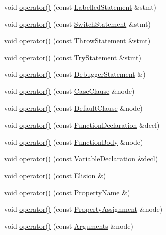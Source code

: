 \begin{DoxyCompactItemize}
void \hyperlink{struct_basic_visitor_af81c51e8a36db9ab923df747463afc11}{operator()} (const \hyperlink{struct_labelled_statement}{Labelled\+Statement} \&stmt)
\item 
void \hyperlink{struct_basic_visitor_ac83f72616fb477a7a649065185eb3895}{operator()} (const \hyperlink{struct_switch_statement}{Switch\+Statement} \&stmt)
\item 
void \hyperlink{struct_basic_visitor_ac42a17b7d2cb244a0b98edce715bd50c}{operator()} (const \hyperlink{struct_throw_statement}{Throw\+Statement} \&stmt)
\item 
void \hyperlink{struct_basic_visitor_a670967e4fafdaff24b8191e9d726ca6a}{operator()} (const \hyperlink{struct_try_statement}{Try\+Statement} \&stmt)
\item 
void \hyperlink{struct_basic_visitor_a643d2e0e4fa076004a987108a455ab5d}{operator()} (const \hyperlink{struct_debugger_statement}{Debugger\+Statement} \&)
\item 
void \hyperlink{struct_basic_visitor_a236e03a953fe8f6c29d764ddd0933653}{operator()} (const \hyperlink{struct_case_clause}{Case\+Clause} \&node)
\item 
void \hyperlink{struct_basic_visitor_a427e6c179f8f598d5c24356701ece311}{operator()} (const \hyperlink{struct_default_clause}{Default\+Clause} \&node)
\item 
void \hyperlink{struct_basic_visitor_af4a6c12c35d165ecf96361ec3faf0583}{operator()} (const \hyperlink{struct_function_declaration}{Function\+Declaration} \&decl)
\item 
void \hyperlink{struct_basic_visitor_a04ba3e59b4d7a7dc9764c3d6fcde6c06}{operator()} (const \hyperlink{struct_function_body}{Function\+Body} \&node)
\item 
void \hyperlink{struct_basic_visitor_a89040003d494fc8559a9d0b19d0e657d}{operator()} (const \hyperlink{struct_variable_declaration}{Variable\+Declaration} \&decl)
\item 
void \hyperlink{struct_basic_visitor_a365b77b2a395a7525224bcb5d422115a}{operator()} (const \hyperlink{struct_elision}{Elision} \&)
\item 
void \hyperlink{struct_basic_visitor_ae447a2098b51b5a9fc6bfd83798ffb01}{operator()} (const \hyperlink{struct_property_name}{Property\+Name} \&)
\item 
void \hyperlink{struct_basic_visitor_af6767fb4a5b244ccacc56e1e2fbb2200}{operator()} (const \hyperlink{struct_property_assignment}{Property\+Assignment} \&node)
\item 
void \hyperlink{struct_basic_visitor_a965705dcbd97ef0f23ead04af33bfce5}{operator()} (const \hyperlink{struct_arguments}{Arguments} \&node)

\end{DoxyCompactItemize}
